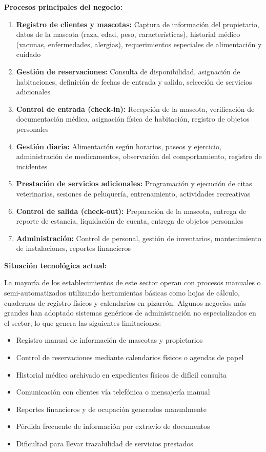 	\textbf{Procesos principales del negocio:}
	\begin{enumerate}
		\item \textbf{Registro de clientes y mascotas:} Captura de información del propietario, datos de la mascota (raza, edad, peso, características), historial médico (vacunas, enfermedades, alergias), requerimientos especiales de alimentación y cuidado
		\item \textbf{Gestión de reservaciones:} Consulta de disponibilidad, asignación de habitaciones, definición de fechas de entrada y salida, selección de servicios adicionales
		\item \textbf{Control de entrada (check-in):} Recepción de la mascota, verificación de documentación médica, asignación física de habitación, registro de objetos personales
		\item \textbf{Gestión diaria:} Alimentación según horarios, paseos y ejercicio, administración de medicamentos, observación del comportamiento, registro de incidentes
		\item \textbf{Prestación de servicios adicionales:} Programación y ejecución de citas veterinarias, sesiones de peluquería, entrenamiento, actividades recreativas
		\item \textbf{Control de salida (check-out):} Preparación de la mascota, entrega de reporte de estancia, liquidación de cuenta, entrega de objetos personales
		\item \textbf{Administración:} Control de personal, gestión de inventarios, mantenimiento de instalaciones, reportes financieros
	\end{enumerate}
	
	\textbf{Situación tecnológica actual:}
	
	La mayoría de los establecimientos de este sector operan con procesos manuales o semi-automatizados utilizando herramientas básicas como hojas de cálculo, cuadernos de registro físicos y calendarios en pizarrón. Algunos negocios más grandes han adoptado sistemas genéricos de administración no especializados en el sector, lo que genera las siguientes limitaciones:
	
	\begin{itemize}
		\item Registro manual de información de mascotas y propietarios
		\item Control de reservaciones mediante calendarios físicos o agendas de papel
		\item Historial médico archivado en expedientes físicos de difícil consulta
		\item Comunicación con clientes vía telefónica o mensajería manual
		\item Reportes financieros y de ocupación generados manualmente
		\item Pérdida frecuente de información por extravío de documentos
		\item Dificultad para llevar trazabilidad de servicios prestados
	\end{itemize}
	
